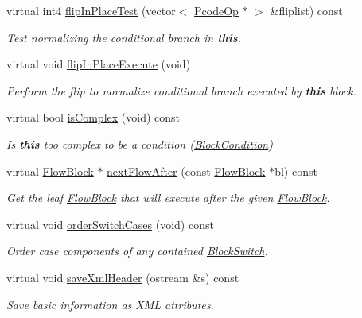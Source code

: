 \begin{DoxyCompactItemize}
virtual int4 \mbox{\hyperlink{class_flow_block_a09019e2e4104844e1a698ccf72560bef}{flip\+In\+Place\+Test}} (vector$<$ \mbox{\hyperlink{class_pcode_op}{Pcode\+Op}} $\ast$ $>$ \&fliplist) const
\begin{DoxyCompactList}\small\item\em Test normalizing the conditional branch in {\bfseries{this}}. \end{DoxyCompactList}\item 
virtual void \mbox{\hyperlink{class_flow_block_a263ec50d30f807a8e1286ac37c6728ce}{flip\+In\+Place\+Execute}} (void)
\begin{DoxyCompactList}\small\item\em Perform the flip to normalize conditional branch executed by {\bfseries{this}} block. \end{DoxyCompactList}\item 
virtual bool \mbox{\hyperlink{class_flow_block_ad77905104bb4077b2d213c27b0582bf7}{is\+Complex}} (void) const
\begin{DoxyCompactList}\small\item\em Is {\bfseries{this}} too complex to be a condition (\mbox{\hyperlink{class_block_condition}{Block\+Condition}}) \end{DoxyCompactList}\item 
virtual \mbox{\hyperlink{class_flow_block}{Flow\+Block}} $\ast$ \mbox{\hyperlink{class_flow_block_a400c220d6c728958396286f54de6dd9e}{next\+Flow\+After}} (const \mbox{\hyperlink{class_flow_block}{Flow\+Block}} $\ast$bl) const
\begin{DoxyCompactList}\small\item\em Get the leaf \mbox{\hyperlink{class_flow_block}{Flow\+Block}} that will execute after the given \mbox{\hyperlink{class_flow_block}{Flow\+Block}}. \end{DoxyCompactList}\item 
virtual void \mbox{\hyperlink{class_flow_block_abd18da44c1332bbb2e495fde85863eb5}{order\+Switch\+Cases}} (void) const
\begin{DoxyCompactList}\small\item\em Order {\itshape case} components of any contained \mbox{\hyperlink{class_block_switch}{Block\+Switch}}. \end{DoxyCompactList}\item 
virtual void \mbox{\hyperlink{class_flow_block_a6cf95f66e3f6940a8342b3e6fdfc5ca2}{save\+Xml\+Header}} (ostream \&s) const
\begin{DoxyCompactList}\small\item\em Save basic information as X\+ML attributes. \end{DoxyCompactList}\item 

\end{DoxyCompactItemize}
